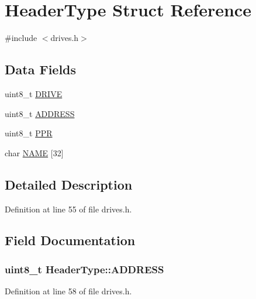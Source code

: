\hypertarget{structHeaderType}{}\section{Header\+Type Struct Reference}
\label{structHeaderType}


{\ttfamily \#include $<$drives.\+h$>$}

\subsection*{Data Fields}
\begin{DoxyCompactItemize}
\item 
uint8\+\_\+t \hyperlink{structHeaderType_a02c17b1f4472794c5f79a9ea8749a922}{D\+R\+I\+VE}
\item 
uint8\+\_\+t \hyperlink{structHeaderType_a70edfd477c537b2fa51c1aa63fcc7bee}{A\+D\+D\+R\+E\+SS}
\item 
uint8\+\_\+t \hyperlink{structHeaderType_ac642cdad0f3874495afa0ab687a56fd0}{P\+PR}
\item 
char \hyperlink{structHeaderType_aab6f096f40fee03da66178f67c730ff9}{N\+A\+ME} \mbox{[}32\mbox{]}
\end{DoxyCompactItemize}


\subsection{Detailed Description}


Definition at line 55 of file drives.\+h.



\subsection{Field Documentation}
\subsubsection[{\texorpdfstring{A\+D\+D\+R\+E\+SS}{ADDRESS}}]{\setlength{\rightskip}{0pt plus 5cm}uint8\+\_\+t Header\+Type\+::\+A\+D\+D\+R\+E\+SS}\hypertarget{structHeaderType_a70edfd477c537b2fa51c1aa63fcc7bee}{}\label{structHeaderType_a70edfd477c537b2fa51c1aa63fcc7bee}


Definition at line 58 of file drives.\+h.



